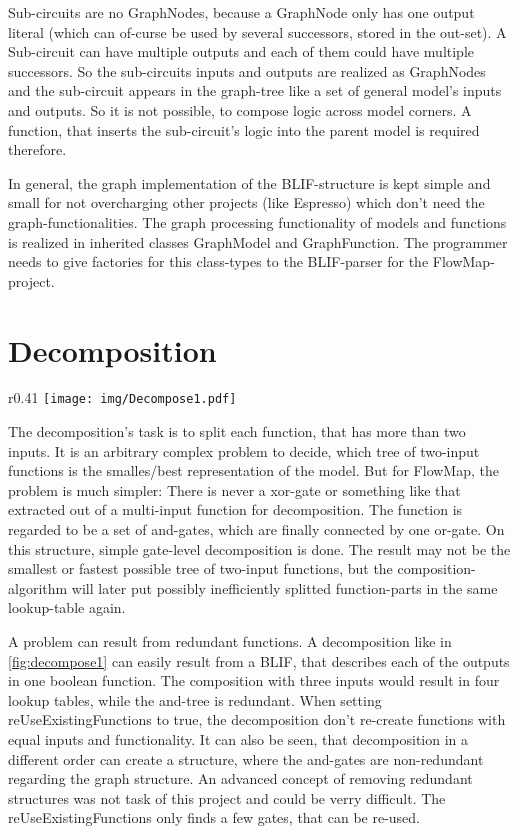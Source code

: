 \documentclass[colorback,accentcolor=tud1c,11pt]{tudreport}
\begin{document}
Sub-circuits are no GraphNodes, because a GraphNode only has one output literal (which can of-curse be used by several successors, stored in the out-set). A Sub-circuit can have multiple outputs and each of them could have multiple successors. So the sub-circuits inputs and outputs are realized as GraphNodes and the sub-circuit appears in the graph-tree like a set of general model's inputs and outputs. So it is not possible, to compose logic across model corners. A function, that inserts the sub-circuit's logic into the parent model is required therefore.

In general, the graph implementation of the BLIF-structure is kept simple and small for not overcharging other projects (like Espresso) which don't need the graph-functionalities. The graph processing functionality of models and functions is realized in inherited classes GraphModel and GraphFunction. The programmer needs to give factories for this class-types to the BLIF-parser for the FlowMap-project.



\chapter{Decomposition}
\begin{wrapfigure}{r}{0.41\textwidth}
\centering
\texttt{[image: img/Decompose1.pdf]}\\
\caption{Example of redundant decomposition}
\label{fig:decompose1}
\end{wrapfigure}
The decomposition's task is to split each function, that has more than two inputs. It is an arbitrary complex problem to decide, which tree of two-input functions is the smalles/best representation of the model. But for FlowMap, the problem is much simpler: There is never a xor-gate or something like that extracted out of a multi-input function for decomposition. The function is regarded to be a set of and-gates, which are finally connected by one or-gate. On this structure, simple gate-level decomposition is done. The result may not be the smallest or fastest possible tree of two-input functions, but the composition-algorithm will later put possibly inefficiently splitted function-parts in the same lookup-table again.

A problem can result from redundant functions. A decomposition like in \ref{fig:decompose1} can easily result from a BLIF, that describes each of the outputs in one boolean function. The composition with three inputs would result in four lookup tables, while the and-tree is redundant. When setting reUseExistingFunctions to true, the decomposition don't re-create functions with equal inputs and functionality. It can also be seen, that decomposition in a different order can create a structure, where the and-gates are non-redundant regarding the graph structure. An advanced concept of removing redundant structures was not task of this project and could be verry difficult. The reUseExistingFunctions only finds a few gates, that can be re-used.
\end{document}
